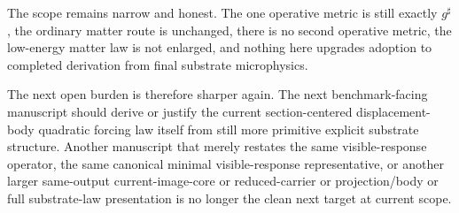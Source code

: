 \documentclass[11pt]{article}
\newcommand{\CompletedMetric}{g^{\sharp}}
\begin{document}
The scope remains narrow and honest. The one operative metric is still exactly \(\CompletedMetric\), the ordinary matter route is unchanged, there is no second operative metric, the low-energy matter law is not enlarged, and nothing here upgrades adoption to completed derivation from final substrate microphysics.

The next open burden is therefore sharper again. The next benchmark-facing manuscript should derive or justify the current section-centered displacement-body quadratic forcing law itself from still more primitive explicit substrate structure. Another manuscript that merely restates the same visible-response operator, the same canonical minimal visible-response representative, or another larger same-output current-image-core or reduced-carrier or projection/body or full substrate-law presentation is no longer the clean next target at current scope.
\end{document}
